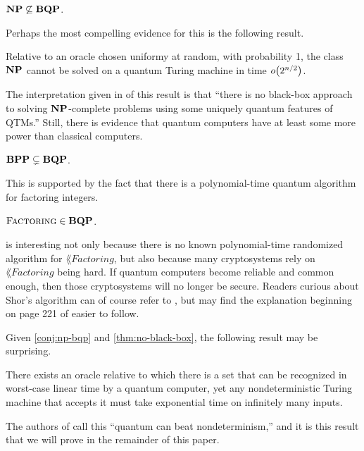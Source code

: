 \documentclass[12pt]{article}
\begin{document}
\begin{conj}
  \label{conj:np-bqp}
  $\mathbf{NP} \not\subseteq \mathbf{BQP}$.
\end{conj}

Perhaps the most compelling evidence for this is the following result.

\begin{thm}
  \label{thm:no-black-box}
  Relative to an oracle chosen uniformy at random, with probability 1, the class
  $\mathbf{NP}$ cannot be solved on a quantum Turing machine in time $\smallo{2^{n/2}}$.
\end{thm}

The interpretation given in \cite{BBBV97} of this result is that ``there is no
black-box approach to solving $\mathbf{NP}$-complete problems using some uniquely
quantum features of QTMs.'' Still, there is evidence that quantum computers have
at least some more power than classical computers.

\begin{conj}
  $\mathbf{BPP} \subsetneq \mathbf{BQP}$.
\end{conj}

This is supported by the fact that there is a polynomial-time quantum algorithm
for factoring integers.

\begin{thm}
  \label{thm:shor}
  $\textsc{Factoring} \in \mathbf{BQP}$.
\end{thm}

 is interesting not only because there is no known
polynomial-time randomized algorithm for $\lang{Factoring}$, but also because
many cryptosystems rely on $\lang{Factoring}$ being hard. If quantum computers
become reliable and common enough, then those cryptosystems will no longer be
secure. Readers curious about Shor's algorithm can of course refer to
\cite{Sho97}, but may find the explanation beginning on page 221 of \cite{AB09}
easier to follow.

Given \cref{conj:np-bqp} and \cref{thm:no-black-box}, the following result may
be surprising.

\begin{thm}[\cite{BB92a}]
  \label{thm:bqp-beat-np}
  There exists an oracle relative to which there is a set that can be recognized
  in worst-case linear time by a quantum computer, yet any nondeterministic
  Turing machine that accepts it must take exponential time on infinitely many
  inputs.
\end{thm}
The authors of \cite{BB92a} call this ``quantum can beat nondeterminism,'' and it
is this result that we will prove in the remainder of this paper.
\end{document}
